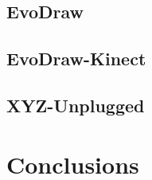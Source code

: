 \subsection{EvoDraw}
\subsection{EvoDraw-Kinect}
\subsection{XYZ-Unplugged}


\section{Conclusions}

\begin{acks}


\end{acks}
